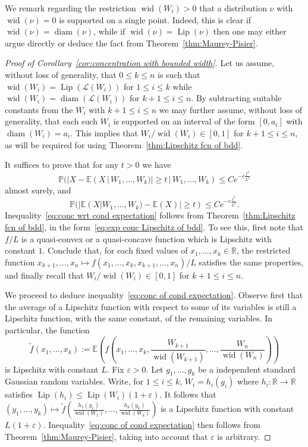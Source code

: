 \documentclass[11pt, reqno]{amsart}
\newcommand{\R}{\mathbb{R}}
\newcommand{\E}{\mathbb{E}}
\newcommand{\eps}{\varepsilon}
\DeclareMathOperator{\lip}{Lip}
\renewcommand{\P}{\mathbb{P}}
\DeclareMathOperator{\diam}{diam}
\DeclareMathOperator{\wid}{wid}
\numberwithin{equation}{section}
\begin{document}
We remark regarding the restriction $\wid(W_i)>0$ that a distribution $\nu$ with $\wid(\nu)=0$ is supported on a single point. Indeed, this is clear if $\wid(\nu)=\diam(\nu)$, while if $\wid(\nu)=\lip(\nu)$ then one may either argue directly or deduce the fact from Theorem~\ref{thm:Maurey-Pisier}.
\begin{proof}[Proof of Corollary~\ref{cor:concentration with bounded width}]
Let us assume, without loss of generality, that $0\le k\le n$ is such that $\wid(W_i) = \lip(\mathcal{L}(W_i))$ for $1\le i\le k$ while $\wid(W_i)=\diam(\mathcal{L}(W_i))$ for $k+1\le i\le n$. By subtracting suitable constants from the $W_i$ with $k+1\le i\le n$ we may further assume, without loss of generality, that each such $W_i$ is supported on an interval of the form $[0,a_i]$ with $\diam(W_i) = a_i$. This implies that $W_i / \wid(W_i)\in[0,1]$ for $k+1\le i\le n$, as will be required for using Theorem~\ref{thm:Lipschitz fcn of bdd}.
    
It suffices to prove that for any $t>0$ we have
\begin{equation}
\label{eq:conc wrt cond expectation}
\P(|X - \E(X\,|\, W_1,\ldots, W_k)|\ge t\,|\, W_1, \ldots, W_k)\le Ce^{-c\frac{t^2}{L^2}}
\end{equation}
almost surely, and
\begin{equation}\label{eq:conc of cond expectation}
\P(|\E(X | W_1,\ldots, W_k) - \E(X)|\ge t)\le Ce^{-c\frac{t^2}{L^2}}.
\end{equation}    
Inequality~\eqref{eq:conc wrt cond expectation} follows from Theorem~\ref{thm:Lipschitz fcn of bdd}, in the form~\eqref{eq:exp conc Lipschitz of bdd}. To see this, first note that $f/L$ is a quasi-convex or a quasi-concave function which is Lipschitz with constant $1$. Conclude that, for each fixed values of $x_1,\ldots, x_k\in\R$, the restricted function $x_{k+1},\ldots,x_n\mapsto f(x_1,\ldots, x_k, x_{k+1},\ldots, x_n)/L$ satisfies the same properties, and finally recall that $W_i / \wid(W_i)\in[0,1]$ for $k+1\le i\le n$.

We proceed to deduce inequality~\eqref{eq:conc of cond expectation}. Observe first that the average of a Lipschitz function with respect to some of its variables is still a Lipschitz function, with the same constant, of the remaining variables. In particular, the function
\begin{equation}
\tilde{f}(x_1,\ldots, x_k):= \E\left(f\left(x_1,\ldots, x_k,\frac{W_{k+1}}{\wid(W_{k+1})},\ldots, \frac{W_n}{\wid(W_n)}\right)\right)
\end{equation}
is Lipschitz with constant $L$. 
Fix $\eps>0$. Let $g_1,\ldots, g_k$ be a independent standard Gaussian random variables. Write, for $1\le i\le k$, $W_i = h_i(g_i)$ where $h_i:\R\to\R$ satisfies $\lip(h_i)\le \lip(W_i)(1+\eps)$. It follows that $(y_1,\ldots, y_k)\mapsto\tilde{f}\left(\frac{h_1(y_1)}{\wid(W_1)},\ldots, \frac{h_k(y_k)}{\wid(W_k)}\right)$ is a Lipschitz function with constant $L(1+\eps)$.  
Inequality~\eqref{eq:conc of cond expectation} then follows from Theorem~\ref{thm:Maurey-Pisier}, taking into account that $\eps$ is arbitrary.
\end{proof}
\end{document}
